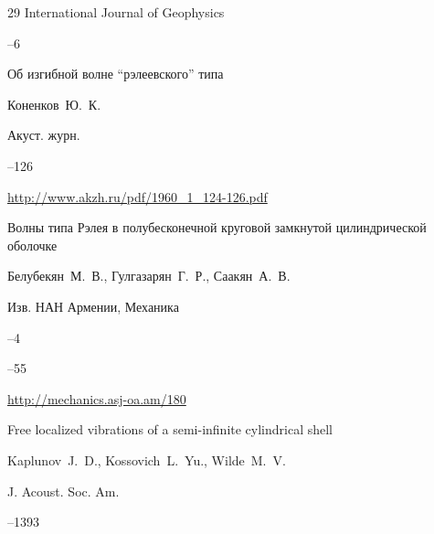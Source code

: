 \begin{thebibliography}{29}
\jour International Journal of Geophysics



--6





\paper Об изгибной волне “рэлеевского” типа

\by  Коненков~Ю.~К.

\jour Акуст. журн.




--126

\elink \url{http://www.akzh.ru/pdf/1960_1_124-126.pdf}





\paper Волны типа Рэлея в полубесконечной круговой замкнутой цилиндрической оболочке

\by  Белубекян~М.~В., Гулгазарян~Г.~Р., Саакян~А.~В.

\jour Изв. НАН Армении, Механика



--4

--55

\elink \url{http://mechanics.asj-oa.am/180}






\paper Free localized vibrations of a semi-infinite cylindrical shell

\by Kaplunov~J.~D., Kossovich~L.~Yu., Wilde~M.~V.

\jour J. Acoust. Soc. Am.




--1393






\end{thebibliography}
